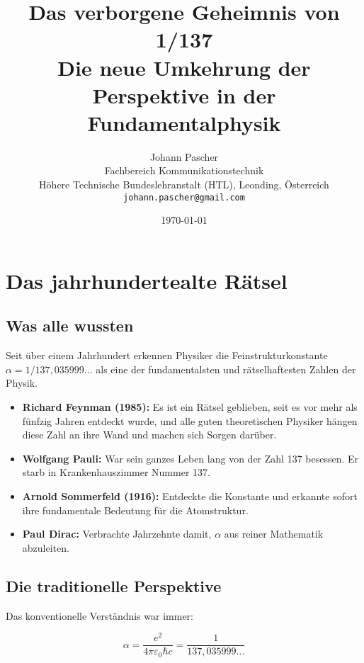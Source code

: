 \documentclass[12pt,a4paper]{article}
\title{
	\textbf{Das verborgene Geheimnis von 1/137}\\
	\vspace{0.5cm}
	\Large Die neue Umkehrung der Perspektive in der Fundamentalphysik
}
\author{Johann Pascher\\
	Fachbereich Kommunikationstechnik\\
	Höhere Technische Bundeslehranstalt (HTL), Leonding, Österreich\\
	\texttt{johann.pascher@gmail.com}}
\date{\today}
\theoremstyle{definition}
\begin{document}
	
	\maketitle
	\thispagestyle{empty}
	\newpage
	
	\tableofcontents
	\newpage
	
	\section{Das jahrhundertealte Rätsel}
	
	\subsection{Was alle wussten}
	
	Seit über einem Jahrhundert erkennen Physiker die Feinstrukturkonstante $\alpha = 1/137,035999...$ als eine der fundamentalsten und rätselhaftesten Zahlen der Physik.
	
	\begin{fundamental}
		\begin{itemize}
			\item \textbf{Richard Feynman (1985):} Es ist ein Rätsel geblieben, seit es vor mehr als fünfzig Jahren entdeckt wurde, und alle guten theoretischen Physiker hängen diese Zahl an ihre Wand und machen sich Sorgen darüber.
			
			\item \textbf{Wolfgang Pauli:} War sein ganzes Leben lang von der Zahl 137 besessen. Er starb in Krankenhauszimmer Nummer 137.
			
			\item \textbf{Arnold Sommerfeld (1916):} Entdeckte die Konstante und erkannte sofort ihre fundamentale Bedeutung für die Atomstruktur.
			
			\item \textbf{Paul Dirac:} Verbrachte Jahrzehnte damit, $\alpha$ aus reiner Mathematik abzuleiten.
		\end{itemize}
	\end{fundamental}
	
	\subsection{Die traditionelle Perspektive}
	
	Das konventionelle Verständnis war immer:
	
	\begin{equation}
		\alpha = \frac{e^2}{4\pi\varepsilon_0\hbar c} = \frac{1}{137,035999...}
	\end{equation}
	
\end{document}
